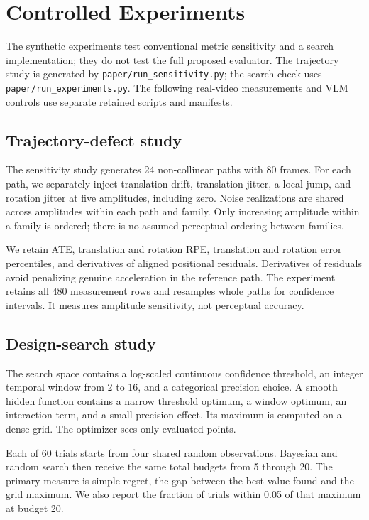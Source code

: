 \documentclass[10pt,twocolumn]{article}
\begin{document}
\section{Controlled Experiments}
The synthetic experiments test conventional metric sensitivity and a search implementation; they do not test the full proposed evaluator. The trajectory study is generated by \texttt{paper/run\_sensitivity.py}; the search check uses \texttt{paper/run\_experiments.py}. The following real-video measurements and VLM controls use separate retained scripts and manifests.

\subsection{Trajectory-defect study}
The sensitivity study generates 24 non-collinear paths with 80 frames. For each path, we separately inject translation drift, translation jitter, a local jump, and rotation jitter at five amplitudes, including zero. Noise realizations are shared across amplitudes within each path and family. Only increasing amplitude within a family is ordered; there is no assumed perceptual ordering between families.

We retain ATE, translation and rotation RPE, translation and rotation error percentiles, and derivatives of aligned positional residuals. Derivatives of residuals avoid penalizing genuine acceleration in the reference path. The experiment retains all 480 measurement rows and resamples whole paths for confidence intervals. It measures amplitude sensitivity, not perceptual accuracy.

\subsection{Design-search study}
The search space contains a log-scaled continuous confidence threshold, an integer temporal window from 2 to 16, and a categorical precision choice. A smooth hidden function contains a narrow threshold optimum, a window optimum, an interaction term, and a small precision effect. Its maximum is computed on a dense grid. The optimizer sees only evaluated points.

Each of 60 trials starts from four shared random observations. Bayesian and random search then receive the same total budgets from 5 through 20. The primary measure is simple regret, the gap between the best value found and the grid maximum. We also report the fraction of trials within 0.05 of that maximum at budget 20.
\end{document}
